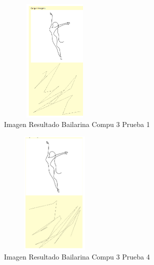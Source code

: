 \documentclass[conference]{IEEEtran}
\begin{document}
\begin{figure}[h]
    \centering
    \includegraphics[width=0.480\textwidth, height=6cm]{bailarina-1-compu3.png} 
    \caption{Imagen Resultado Bailarina Compu 3 Prueba 1}
    \label{fig:mi_imagen}
\end{figure}

\begin{figure}[h]
    \centering
    \includegraphics[width=0.480\textwidth, height=6cm]{bailarina-4-compu3.png} 
    \caption{Imagen Resultado Bailarina Compu 3 Prueba 4}
    \label{fig:mi_imagen}
\end{figure}
\end{document}
